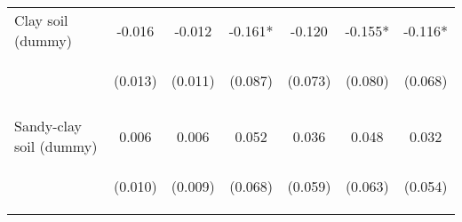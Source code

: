 \begin{center}
\begin{tabular}{lcccccc}
Clay soil (dummy) & -0.016 & -0.012 & -0.161* & -0.120 & -0.155* & -0.116* \\
 & \begin{footnotesize}(0.013)\end{footnotesize} & \begin{footnotesize}(0.011)\end{footnotesize} & \begin{footnotesize}(0.087)\end{footnotesize} & \begin{footnotesize}(0.073)\end{footnotesize} & \begin{footnotesize}(0.080)\end{footnotesize} & \begin{footnotesize}(0.068)\end{footnotesize} \\
\vspace{4pt} & \begin{footnotesize}[0.200]\end{footnotesize} & \begin{footnotesize}[0.272]\end{footnotesize} & \begin{footnotesize}[0.064]\end{footnotesize} & \begin{footnotesize}[0.103]\end{footnotesize} & \begin{footnotesize}[0.053]\end{footnotesize} & \begin{footnotesize}[0.086]\end{footnotesize} \\
Sandy-clay soil (dummy) & 0.006 & 0.006 & 0.052 & 0.036 & 0.048 & 0.032 \\
 & \begin{footnotesize}(0.010)\end{footnotesize} & \begin{footnotesize}(0.009)\end{footnotesize} & \begin{footnotesize}(0.068)\end{footnotesize} & \begin{footnotesize}(0.059)\end{footnotesize} & \begin{footnotesize}(0.063)\end{footnotesize} & \begin{footnotesize}(0.054)\end{footnotesize} \\

\end{tabular}
\end{center}
